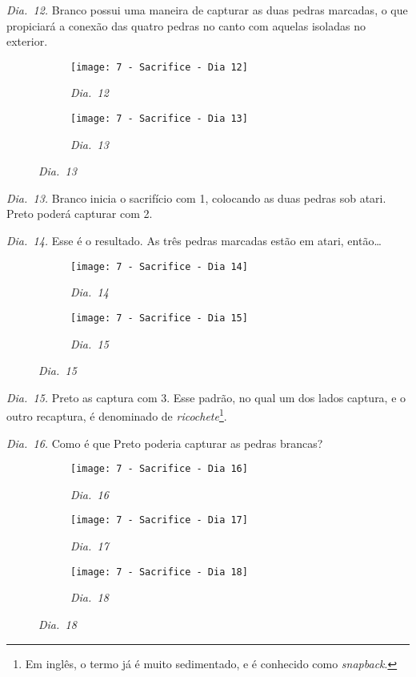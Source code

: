 \emph{Dia.\@~12.} Branco possui uma maneira de capturar as duas pedras marcadas, o que propiciará a conexão das quatro pedras no canto com aquelas isoladas no exterior.

\begin{figure}[h!]
    \centering
    \begin{subfigure}[t]{.31\textwidth}
        \texttt{[image: 7 - Sacrifice - Dia 12]}
        \caption*{\emph{Dia.\@~12}}
    \end{subfigure}
    \hspace{1cm}
    \begin{subfigure}[t]{.31\textwidth}
        \texttt{[image: 7 - Sacrifice - Dia 13]}
        \caption*{\emph{Dia.\@~13}}
    \end{subfigure}
\end{figure}

\emph{Dia.\@~13.} Branco inicia o sacrifício com 1, colocando as duas pedras sob atari. Preto poderá capturar com 2.

\emph{Dia.\@~14.} Esse é o resultado. As três pedras marcadas estão em atari, então\ldots

\begin{figure}[h!]
    \centering
    \begin{subfigure}[t]{.31\textwidth}
        \texttt{[image: 7 - Sacrifice - Dia 14]}
        \caption*{\emph{Dia.\@~14}}
    \end{subfigure}
    \hspace{1cm}
    \begin{subfigure}[t]{.31\textwidth}
        \texttt{[image: 7 - Sacrifice - Dia 15]}
        \caption*{\emph{Dia.\@~15}}
    \end{subfigure}
\end{figure}

\emph{Dia.\@~15.} Preto as captura com 3. Esse padrão, no qual um dos lados captura, e o outro recaptura, é denominado de \emph{ricochete}\footnote{Em inglês, o termo já é muito sedimentado, e é conhecido como \emph{snapback}.}.

\pagebreak

\emph{Dia.\@~16.} Como é que Preto poderia capturar as pedras brancas?

\begin{figure}[h!]
    \centering
    \begin{subfigure}[t]{.31\textwidth}
        \texttt{[image: 7 - Sacrifice - Dia 16]}
        \caption*{\emph{Dia.\@~16}}
    \end{subfigure}
    \hfill
    \begin{subfigure}[t]{.31\textwidth}
        \texttt{[image: 7 - Sacrifice - Dia 17]}
        \caption*{\emph{Dia.\@~17}}
    \end{subfigure}
    \hfill
    \begin{subfigure}[t]{.31\textwidth}
        \texttt{[image: 7 - Sacrifice - Dia 18]}
        \caption*{\emph{Dia.\@~18}}
    \end{subfigure}
\end{figure}

